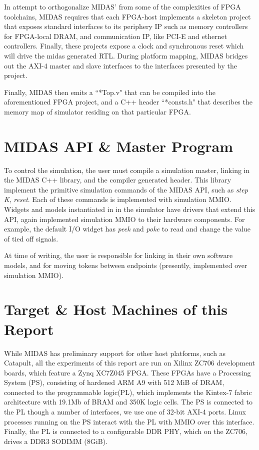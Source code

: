 In attempt to orthogonalize MIDAS' from some of the complexities of FPGA
toolchains, MIDAS requires that each FPGA-host implements a skeleton project
that exposes standard interfaces to its periphery IP such as  memory
controllers for FPGA-local DRAM, and communication IP, like PCI-E and ethernet
controllers. Finally, these projects expose a clock and synchronous reset which
will drive the midas generated RTL.  During platform mapping, MIDAS bridges out
the AXI-4 master and slave interfaces to the interfaces presented by the
project.

Finally, MIDAS then emits a ``*Top.v" that can be compiled into the
aforementioned FPGA project, and a C++ header ``*consts.h" that describes the
memory map of simulator residing on that particular FPGA.

\section{MIDAS API \& Master Program}

To control the simulation, the user must compile a simulation master, linking
in the MIDAS C++ library, and the compiler generated header. This library
implement the primitive simulation commands of the MIDAS API, such as
\emph{step K}, \emph{reset}. Each of these commands is implemented with
simulation MMIO.  Widgets and models instantiated in in the simulator have
drivers that extend this API, again implemented simulation MMIO to their
hardware components. For example, the default I/O widget has \emph{peek} and
\emph{poke} to read and change the value of tied off signals.

At time of writing, the user is responsible for linking in their own software
models, and for moving tokens between endpoints (presently, implemented over
simulation MMIO).

\section{Target \& Host Machines of this Report}\label{sec:targetandhostmachines}

While MIDAS has preliminary support for other host platforms, such as Catapult,
all the experiments of this report are run on Xilinx ZC706 development boards,
which feature a Zynq XC7Z045 FPGA. These FPGAs have a Processing System (PS),
consisting of hardened ARM A9 with 512 MiB of DRAM, connected to the
programmable logic(PL), which implements the Kintex-7 fabric architecture with
19.1Mb of BRAM and 350K logic cells. The PS is connected to the PL though a
number of interfaces, we use one of 32-bit AXI-4 ports. Linux processes
running on the PS interact with the PL with MMIO over this interface.  Finally,
the PL is connected to a configurable DDR PHY, which on the ZC706, drives a
DDR3 SODIMM (8GiB).

